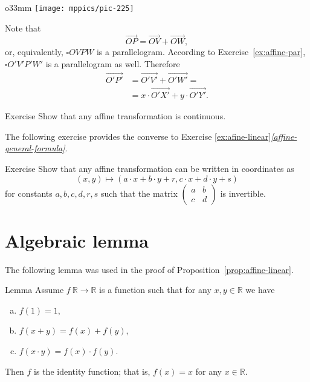 \begin{wrapfigure}{o}{33mm}
\centering
\texttt{[image: mppics/pic-225]}
\end{wrapfigure}

Note that 
\[\overrightarrow{OP}=\overrightarrow{OV}+\overrightarrow{OW},\]
or, equivalently, $\square OVPW$ is a parallelogram.
According to Exercise~\ref{ex:affine-par}, $\square O'V'P'W'$ is a parallelogram as well.
Therefore 
\begin{align*}\overrightarrow{O'P'}&=\overrightarrow{O'V'}+\overrightarrow{O'W'}=
\\
&=x\cdot\overrightarrow{O'X'}+y\cdot\overrightarrow{O'Y'}.
\end{align*}
\qedsf

\begin{thm}{Exercise}\label{ex:affine-continuous}
Show that any affine transformation is continuous.
\end{thm}

The following exercise provides the converse to Exercise \ref{ex:afine-linear}\textit{\ref{affine-general-formula}}.

\begin{thm}{Exercise}\label{ex:affine-coordinates}
Show that any affine transformation can be written in coordinates as 
\[(x,y)\mapsto(a\cdot x+b\cdot y+r,c\cdot x+d\cdot y+s)\]
for constants $a,b,c,d,r,s$ such that the matrix $(\begin{smallmatrix}a&b\\c&d\end{smallmatrix})$ is invertible. 
\end{thm}


\section{Algebraic lemma}

The following lemma was used in the proof of Proposition~\ref{prop:affine-linear}.

\begin{thm}{Lemma}\label{lem:R-auto}
Assume $f\:\mathbb{R}\to\mathbb{R}$ is a function such that for any $x,y\in\mathbb{R}$ we have
\begin{enumerate}[(a)]
\item\label{lem:R-auto:a} $f(1)=1$,
\item\label{lem:R-auto:b} $f(x+y)=f(x)+f(y)$,
\item\label{lem:R-auto:c} $f(x\cdot y)=f(x)\cdot f(y)$.
\end{enumerate}

Then $f$ is the identity function; that is,
$f(x)=x$ for any $x\in \mathbb{R}$.
\end{thm}

